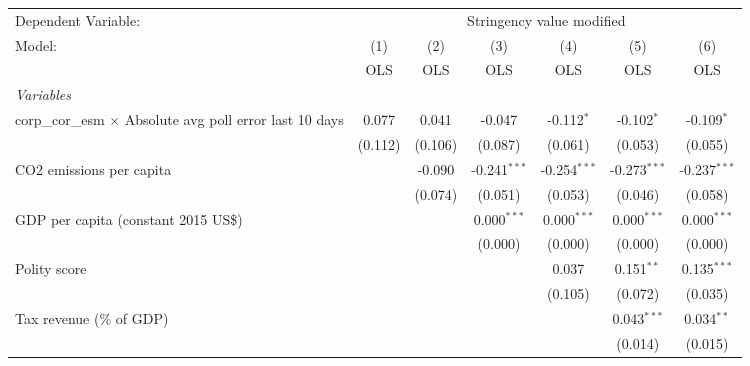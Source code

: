 
\begingroup
\centering
\begin{tabular}{lcccccc}
   \toprule
   Dependent Variable: & \multicolumn{6}{c}{Stringency value modified}\\
   Model:                                                          & (1)     & (2)     & (3)            & (4)            & (5)            & (6)\\  
                                                                   &  OLS    & OLS     & OLS            & OLS            & OLS            & OLS\\  
   \midrule
   \emph{Variables}\\
   corp\_cor\_esm $\times$ Absolute avg poll error last 10 days    & 0.077   & 0.041   & -0.047         & -0.112$^{*}$   & -0.102$^{*}$   & -0.109$^{*}$\\   
                                                                   & (0.112) & (0.106) & (0.087)        & (0.061)        & (0.053)        & (0.055)\\   
   CO2 emissions per capita                                        &         & -0.090  & -0.241$^{***}$ & -0.254$^{***}$ & -0.273$^{***}$ & -0.237$^{***}$\\   
                                                                   &         & (0.074) & (0.051)        & (0.053)        & (0.046)        & (0.058)\\   
   GDP per capita (constant 2015 US\$)                             &         &         & 0.000$^{***}$  & 0.000$^{***}$  & 0.000$^{***}$  & 0.000$^{***}$\\   
                                                                   &         &         & (0.000)        & (0.000)        & (0.000)        & (0.000)\\   
   Polity score                                                    &         &         &                & 0.037          & 0.151$^{**}$   & 0.135$^{***}$\\   
                                                                   &         &         &                & (0.105)        & (0.072)        & (0.035)\\   
   Tax revenue (\% of GDP)                                         &         &         &                &                & 0.043$^{***}$  & 0.034$^{**}$\\   
                                                                   &         &         &                &                & (0.014)        & (0.015)\\   

\end{tabular}
